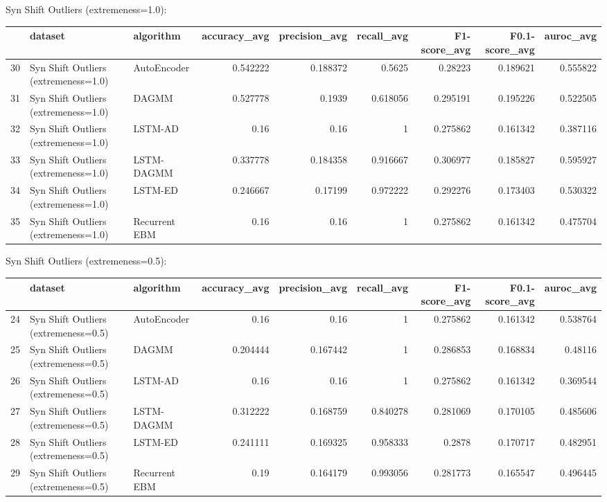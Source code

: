 Syn Shift Outliers (extremeness=1.0):

\begin{tabular}{rllrrrrrr}
\hline
    & dataset                              & algorithm     &   accuracy\_avg &   precision\_avg &   recall\_avg &   F1-score\_avg &   F0.1-score\_avg &   auroc\_avg \\
\hline
 30 & Syn Shift Outliers (extremeness=1.0) & AutoEncoder   &       0.542222 &        0.188372 &     0.5625   &       0.28223  &         0.189621 &    0.555822 \\
 31 & Syn Shift Outliers (extremeness=1.0) & DAGMM         &       0.527778 &        0.1939   &     0.618056 &       0.295191 &         0.195226 &    0.522505 \\
 32 & Syn Shift Outliers (extremeness=1.0) & LSTM-AD       &       0.16     &        0.16     &     1        &       0.275862 &         0.161342 &    0.387116 \\
 33 & Syn Shift Outliers (extremeness=1.0) & LSTM-DAGMM    &       0.337778 &        0.184358 &     0.916667 &       0.306977 &         0.185827 &    0.595927 \\
 34 & Syn Shift Outliers (extremeness=1.0) & LSTM-ED       &       0.246667 &        0.17199  &     0.972222 &       0.292276 &         0.173403 &    0.530322 \\
 35 & Syn Shift Outliers (extremeness=1.0) & Recurrent EBM &       0.16     &        0.16     &     1        &       0.275862 &         0.161342 &    0.475704 \\
\hline
\end{tabular}

Syn Shift Outliers (extremeness=0.5):

\begin{tabular}{rllrrrrrr}
\hline
    & dataset                              & algorithm     &   accuracy\_avg &   precision\_avg &   recall\_avg &   F1-score\_avg &   F0.1-score\_avg &   auroc\_avg \\
\hline
 24 & Syn Shift Outliers (extremeness=0.5) & AutoEncoder   &       0.16     &        0.16     &     1        &       0.275862 &         0.161342 &    0.538764 \\
 25 & Syn Shift Outliers (extremeness=0.5) & DAGMM         &       0.204444 &        0.167442 &     1        &       0.286853 &         0.168834 &    0.48116  \\
 26 & Syn Shift Outliers (extremeness=0.5) & LSTM-AD       &       0.16     &        0.16     &     1        &       0.275862 &         0.161342 &    0.369544 \\
 27 & Syn Shift Outliers (extremeness=0.5) & LSTM-DAGMM    &       0.312222 &        0.168759 &     0.840278 &       0.281069 &         0.170105 &    0.485606 \\
 28 & Syn Shift Outliers (extremeness=0.5) & LSTM-ED       &       0.241111 &        0.169325 &     0.958333 &       0.2878   &         0.170717 &    0.482951 \\
 29 & Syn Shift Outliers (extremeness=0.5) & Recurrent EBM &       0.19     &        0.164179 &     0.993056 &       0.281773 &         0.165547 &    0.496445 \\
\hline
\end{tabular}

